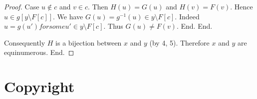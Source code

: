 \documentclass{article}
\begin{document}
\begin{forthel}
\begin{proof}
          Case $u \notin c$ and $v \in c$.
            Then $H(u) = G(u)$ and $H(v) = F(v)$.
            Hence $u \in g[y \setminus F[c]]$.
            We have $G(u) = g^{-1}(u) \in y \setminus F[c]$.
            Indeed $u = g(u') for some u' \in y \setminus F[c]$.
            Thus $G(u) \neq F(v)$.
          End.
        End.

        Consequently $H$ is a bijection between $x$ and $y$ (by 4, 5).
        Therefore $x$ and $y$ are equinumerous.
      End.
    \end{proof}
  \end{forthel}

  \printbibliography

  \section*{Copyright}
  \doclicenseThis
\end{document}
